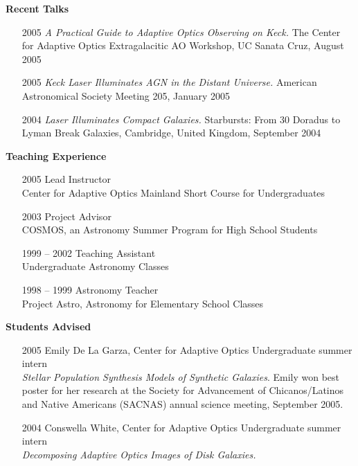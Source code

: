 \documentclass[12pt]{article}
\begin{document}
\noindent
{\bf{Recent Talks}}
\begin{itemize}
\addtolength{\itemsep}{-0.25cm}

\item[2005] \emph{A Practical Guide to Adaptive Optics Observing on Keck.} 
The Center for Adaptive Optics Extragalacitic AO Workshop, UC Sanata Cruz, August 2005

\item[2005] \emph{Keck Laser Illuminates AGN in the Distant Universe.} American Astronomical Society Meeting 205, January 2005

\item[2004]  \emph{Laser Illuminates Compact Galaxies.} Starbursts: From 30 Doradus to Lyman Break Galaxies, Cambridge, United Kingdom, September 2004
\end{itemize}

\noindent
{\bf{Teaching Experience}}
\begin{itemize}
\addtolength{\itemsep}{-0.25cm}
\item[2005] Lead Instructor \\ Center for Adaptive Optics Mainland Short Course for Undergraduates
\item[2003] Project Advisor \\COSMOS, an Astronomy Summer Program for High School Students
\item[1999] -- 2002 Teaching Assistant \\  Undergraduate Astronomy Classes
\item[1998] -- 1999 Astronomy Teacher \\ Project Astro, Astronomy for Elementary School Classes
\end{itemize}

\noindent
{\bf{Students Advised}}
\begin{itemize}
\addtolength{\itemsep}{-0.25cm}
\item[2005] Emily De La Garza, Center for Adaptive Optics Undergraduate summer intern\\ \emph{Stellar Population Synthesis Models of Synthetic Galaxies}.   Emily won best poster for her research at the Society for Advancement of Chicanos/Latinos and Native Americans (SACNAS) annual science meeting, September 2005.
\item[2004]  Conswella White, Center for Adaptive Optics Undergraduate summer intern\\ \emph{Decomposing Adaptive Optics Images of Disk Galaxies.}
\end{itemize}
\end{document}
